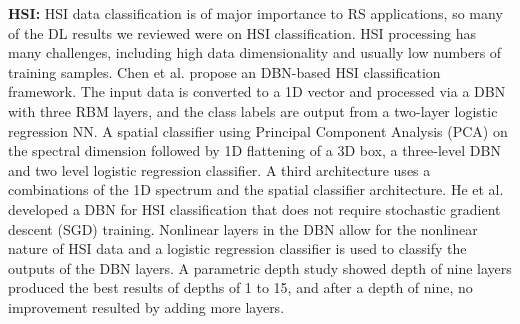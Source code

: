 \documentclass[12pt]{spieman}
\begin{document}
\begin{spacing}{1}
\textbf{HSI:} HSI data classification is of major importance to RS applications, so many of the DL results we reviewed were on HSI classification. HSI processing has many challenges, including high data dimensionality and usually low numbers of training samples. Chen et al. \cite{Chen2015SpectralSpatial} propose an DBN-based HSI classification framework. The input data is converted to a 1D vector and processed via a DBN with three RBM layers, and the class labels are output from a two-layer logistic regression NN. A spatial classifier using Principal Component Analysis (PCA) on the spectral dimension followed by 1D flattening of a 3D box, a three-level DBN and two level logistic regression classifier. A third architecture uses a combinations of the 1D spectrum and the spatial classifier architecture. He et al. \cite{He2016Hyperspectral} developed a DBN for HSI classification that does not require stochastic gradient descent (SGD) training. Nonlinear layers in the DBN allow for the nonlinear nature of HSI data and a logistic regression classifier is used to classify the outputs of the DBN layers. A parametric depth study showed depth of nine layers produced the best results of depths of 1 to 15, and after a depth of nine, no improvement resulted by adding more layers.


\end{spacing}
\end{document}
